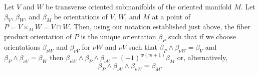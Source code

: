 \begin{proposition}\label{P: orient intersection}
	Let $V$ and $W$ be transverse oriented submanifolds of the oriented manifold $M$. 
	Let $\beta_V$, $\beta_W$, and $\beta_M$ be orientations of $V$, $W$, and $M$ at a point of $P = V \times_M W = V \cap W$.
	Then, using our notation established just above, the fiber product orientation of $P$ is the unique orientation $\beta_P$ such that if we choose orientations $\beta_{\nu W}$ and $\beta_{\nu V}$ for $\nu W$ and $\nu V$ such that $\beta_P \wedge \beta_{\nu W} = \beta_V$ and $\beta_P \wedge \beta_{\nu V} = \beta_W$ then $\beta_{\nu W} \wedge \beta_P \wedge \beta_{\nu V} = (-1)^{w(m+1)}\beta_M$ or, alternatively, $$\beta_P \wedge \beta_{\nu V} \wedge \beta_{\nu W} = \beta_M.$$
\end{proposition}

